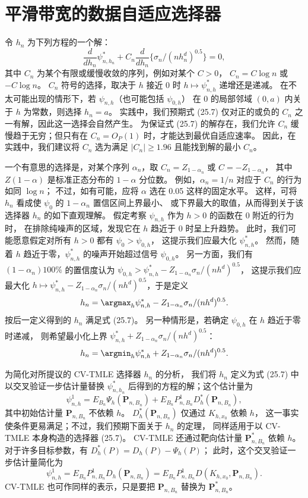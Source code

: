 \section{平滑带宽的数据自适应选择器}

令 $h_n$ 为下列方程的一个解：
\begin{equation}
 \frac{d}{dh_n}\psi^*_{n,h_n}
 +C_n\frac{d}{dh_n}\{\sigma_n/(nh_n^d)^{0.5}\}=0,
\tag{25.7}
\end{equation}
其中 $C_n$ 为某个有限或缓慢收敛的序列，例如对某个 $C>0$，
$C_n=C\log n$ 或 $-C\log n$。
$C_n$ 符号的选择，取决于 $h$ 接近 0 时 $h\mapsto\psi^*_{n,h}$ 递增还是递减。
在不太可能出现的情形下，若 $\psi_{n,h}$（也可能包括 $\psi_{0,h}$）
在 0 的局部邻域 $(0,a)$ 内关于 $h$ 为常数，则选择 $h_n=a$。
实践中，我们预期式 (25.7) 仅对正的或负的 $C_n$ 之一有解，因此这一选择会自然产生。
为保证式 (25.7) 的解存在，我们允许 $C_n$ 缓慢趋于无穷；但只有在
$C_n=O_P(1)$ 时，才能达到最优自适应速率。
因此，在实践中，我们建议将 $C_n$ 选为满足 $|C_n|\geq1.96$
且能找到解的最小 $C_n$。

一个有意思的选择是，对某个序列 $\alpha_n$，取
$C_n=Z_{1-\alpha_n}$ 或 $C=-Z_{1-\alpha_n}$，
其中 $Z(1-\alpha)$ 是标准正态分布的 $1-\alpha$ 分位数。
例如，$\alpha_n=1/n$ 对应于 $C_n$ 的行为如同 $\log n$；
不过，如有可能，应将 $\alpha$ 选在 0.05 这样的固定水平。
这样，可将 $h_n$ 看成使 $\psi_0$ 的 $1-\alpha_n$ 置信区间上界最小、
或下界最大的取值，从而得到关于该选择器 $h_n$ 的如下直观理解。
假定考察 $\psi_{n,h}$ 作为 $h>0$ 的函数在 0 附近的行为时，
在排除纯噪声的区域，发现它在 $h$ 趋近于 0 时呈上升趋势。
此时，我们可能愿意假定对所有 $h>0$ 都有 $\psi_0>\psi_{0,h}$，
这提示我们应最大化 $\psi^*_{n,h}$。
然而，随着 $h$ 趋近于零，$\psi^*_{n,h}$ 的噪声开始超过信号 $\psi_{0,h}$。
另一方面，我们有 $(1-\alpha_n)100\%$ 的置信度认为
$\psi_{0,h}>\psi^*_{n,h}-Z_{1-\alpha_n}\sigma_n/(nh^d)^{0.5}$，
这提示我们应最大化
$h\mapsto\psi^*_{n,h}-Z_{1-\alpha_n}\sigma_n/(nh^d)^{0.5}$，于是定义
\[
 h_n=\argmax_h\psi^*_{n,h}
 -Z_{1-\alpha_n}\sigma_n/(nh^d)^{0.5}.
\]
按后一定义得到的 $h_n$ 满足式 (25.7)。
另一种情形是，若确定 $\psi_{0,h}$ 在 $h$ 趋近于零时递减，
则希望最小化上界
$\psi^*_{n,h}+Z_{1-\alpha_n}\sigma_n/(nh^d)^{0.5}$：
\[
 h_n=\argmin_h\psi^*_{n,h}
 +Z_{1-\alpha_n}\sigma_n/(nh^d)^{0.5}.
\]

为简化对所提议的 CV-TMLE 选择器 $h_n$ 的分析，
我们将 $h_n$ 定义为式 (25.7) 中以交叉验证一步估计量替换
$\psi^*_{n,h_n}$ 后得到的方程的解；这个估计量为
\begin{equation}
 \psi^1_{n,h}=E_{B_n}\Psi_h(\mathbf P_{n,B_n})
 +E_{B_n}P^1_{n,B_n}D_h^*(\mathbf P_{n,B_n}),
\tag{25.8}
\end{equation}
其中初始估计量 $\mathbf P_{n,B_n}$ 不依赖 $h$。
$D_h^*(\mathbf P_{n,B_n})$ 仅通过 $K_{h,x_0}$ 依赖 $h$，
这一事实使条件更易满足；不过，我们预期下面关于 $h_n$ 的定理，
同样适用于以 CV-TMLE 本身构造的选择器 (25.7)。
CV-TMLE 还通过靶向估计量 $\mathbf P^*_{n,B_n}$ 依赖 $h$。
对于许多目标参数，有 $D_h^*(P)=D_h(P)-\Psi_h(P)$；
此时，这个交叉验证一步估计量简化为
\[
 \psi^1_{n,h}=E_{B_n}P^1_{n,B_n}D_h(\mathbf P_{n,B_n})
 =E_{B_n}P^1_{n,B_n}D(K_{h,x_0},\mathbf P_{n,B_n}).
\]
CV-TMLE 也可作同样的表示，只是要把 $\mathbf P_{n,B_n}$
替换为 $\mathbf P^*_{n,B_n}$。

